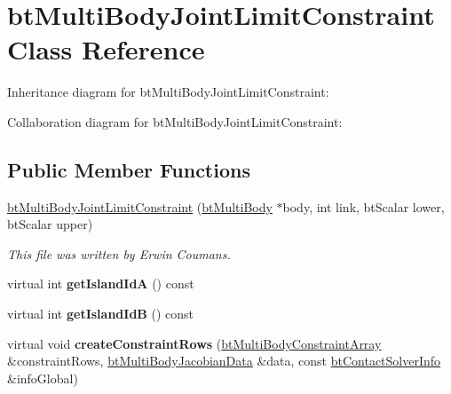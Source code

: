 \hypertarget{classbt_multi_body_joint_limit_constraint}{\section{bt\+Multi\+Body\+Joint\+Limit\+Constraint Class Reference}
\label{classbt_multi_body_joint_limit_constraint}
}


Inheritance diagram for bt\+Multi\+Body\+Joint\+Limit\+Constraint\+:


Collaboration diagram for bt\+Multi\+Body\+Joint\+Limit\+Constraint\+:
\subsection*{Public Member Functions}
\begin{DoxyCompactItemize}
\item 
\hypertarget{classbt_multi_body_joint_limit_constraint_af582f794235694f229618cc0e948bca5}{\hyperlink{classbt_multi_body_joint_limit_constraint_af582f794235694f229618cc0e948bca5}{bt\+Multi\+Body\+Joint\+Limit\+Constraint} (\hyperlink{classbt_multi_body}{bt\+Multi\+Body} $\ast$body, int link, bt\+Scalar lower, bt\+Scalar upper)}\label{classbt_multi_body_joint_limit_constraint_af582f794235694f229618cc0e948bca5}

\begin{DoxyCompactList}\small\item\em This file was written by Erwin Coumans. \end{DoxyCompactList}\item 
\hypertarget{classbt_multi_body_joint_limit_constraint_ac58af490ae187ca23dfe03bf59b41aa4}{virtual int {\bfseries get\+Island\+Id\+A} () const }\label{classbt_multi_body_joint_limit_constraint_ac58af490ae187ca23dfe03bf59b41aa4}

\item 
\hypertarget{classbt_multi_body_joint_limit_constraint_a0a55a6b4b7bb9623bd8bce52a010eed9}{virtual int {\bfseries get\+Island\+Id\+B} () const }\label{classbt_multi_body_joint_limit_constraint_a0a55a6b4b7bb9623bd8bce52a010eed9}

\item 
\hypertarget{classbt_multi_body_joint_limit_constraint_ac7133523141f1280f4df2f6bff8bdab0}{virtual void {\bfseries create\+Constraint\+Rows} (\hyperlink{classbt_aligned_object_array}{bt\+Multi\+Body\+Constraint\+Array} \&constraint\+Rows, \hyperlink{structbt_multi_body_jacobian_data}{bt\+Multi\+Body\+Jacobian\+Data} \&data, const \hyperlink{structbt_contact_solver_info}{bt\+Contact\+Solver\+Info} \&info\+Global)}\label{classbt_multi_body_joint_limit_constraint_ac7133523141f1280f4df2f6bff8bdab0}

\end{DoxyCompactItemize}
